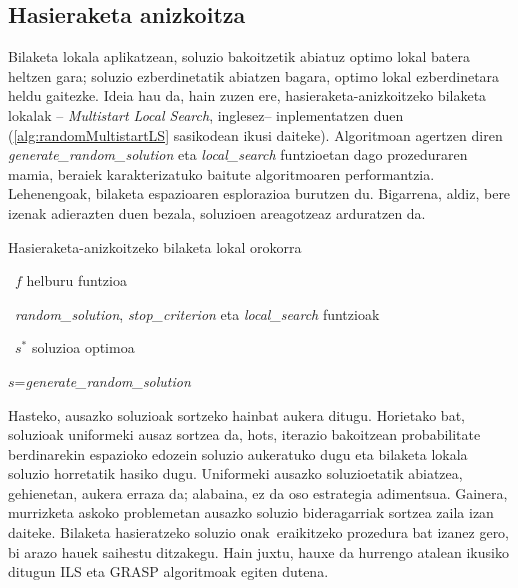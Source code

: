 \documentclass[eu]{ifirak}\usepackage[]{graphicx}\usepackage[]{color}
\newcommand{\zkk}{\guillemotleft}
\newcommand{\skk}{\guillemotright}
\begin{document}
\subsection{Hasieraketa anizkoitza}\label{sec:multistart}
Bilaketa lokala aplikatzean, soluzio bakoitzetik abiatuz optimo lokal batera heltzen gara; soluzio ezberdinetatik abiatzen bagara, optimo lokal ezberdinetara heldu gaitezke. Ideia hau da, hain zuzen ere, hasieraketa-anizkoitzeko bilaketa lokalak -- {\it Multistart Local Search}, inglesez-- inplementatzen duen (\ref{alg:randomMultistartLS} sasikodean ikusi daiteke). Algoritmoan agertzen diren \textit{generate\_random\_solution} eta \textit{local\_search} funtzioetan dago prozeduraren mamia, beraiek karakterizatuko baitute algoritmoaren performantzia. Lehenengoak, bilaketa espazioaren esplorazioa burutzen du. Bigarrena, aldiz, bere izenak adierazten duen bezala, soluzioen areagotzeaz arduratzen da.

\begin{ifalgorithm}[t]
\begin{ifpseudo}{Hasieraketa-anizkoitzeko bilaketa lokal orokorra}
\item \In\ $f$ helburu funtzioa
\item \In\ \textit{random\_solution}, \textit{stop\_criterion} eta \textit{local\_search} funtzioak
\item \Out\ $s^*$ soluzioa optimoa
\item $s$=\textit{generate\_random\_solution}
\item {}
\item {}
\item {}
\item {}
\item \Done
\end{ifpseudo}
\caption{Hasieraketa anizkoitza erabiltzen duen bilaketa lokalaren hedapenaren sasikode orokorra}\label{alg:randomMultistartLS}
\end{ifalgorithm}

Hasteko, ausazko soluzioak sortzeko hainbat aukera ditugu. Horietako bat, soluzioak uniformeki ausaz sortzea da, hots, iterazio bakoitzean probabilitate berdinarekin espazioko edozein soluzio aukeratuko dugu eta bilaketa lokala soluzio horretatik hasiko dugu. Uniformeki ausazko soluzioetatik abiatzea, gehienetan, aukera erraza da; alabaina, ez da oso estrategia adimentsua. Gainera, murrizketa askoko problemetan ausazko soluzio bideragarriak sortzea zaila izan daiteke. Bilaketa hasieratzeko soluzio \zkk onak\skk\ eraikitzeko prozedura bat izanez gero, bi arazo hauek saihestu ditzakegu. Hain juxtu, hauxe da hurrengo atalean ikusiko ditugun ILS eta GRASP algoritmoak egiten dutena. 
\end{document}
